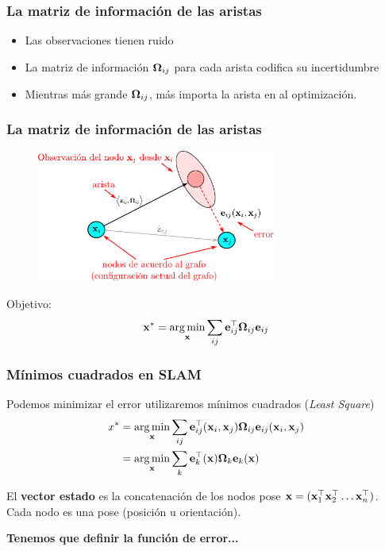 \begin{frame}
    \frametitle{La matriz de información de las aristas}
    \begin{itemize}
        \item Las observaciones tienen ruido
        \item La matriz de información $\boldsymbol{\mathbf{\Omega}}_{ij}$ para cada arista codifica su incertidumbre
        \item Mientras más grande $\boldsymbol{\mathbf{\Omega}}_{ij}$, más importa la arista en al optimización.
    \end{itemize}
    
\end{frame}

\begin{frame}
    \frametitle{La matriz de información de las aristas}
    \begin{figure}[!h]
        \includegraphics[width=0.7\textwidth]{images/factor_graph_edge_example.pdf}
    \end{figure}

    Objetivo:
    \begin{equation*}
        \boldsymbol{\mathbf{x}}^{*} = \operatorname*{arg\,min}_{\boldsymbol{\mathbf{x}}} \sum_{ij} \boldsymbol{\mathbf{e}}^{\top}_{ij} \boldsymbol{\mathbf{\Omega}}_{ij} \boldsymbol{\mathbf{e}}_{ij}
    \end{equation*}
    
\end{frame}



\begin{frame}
    \frametitle{Mínimos cuadrados en SLAM}
    Podemos minimizar el error utilizaremos mínimos cuadrados (\emph{Least Square})
    \begin{align*}
        x^{*} &= \operatorname*{arg\,min}_{\boldsymbol{\mathbf{x}}} \sum_{ij} \boldsymbol{\mathbf{e}}^{\top}_{ij}(\boldsymbol{\mathbf{x}}_{i},\boldsymbol{\mathbf{x}}_{j}) \boldsymbol{\mathbf{\Omega}}_{ij} \boldsymbol{\mathbf{e}}_{ij}(\boldsymbol{\mathbf{x}}_{i},\boldsymbol{\mathbf{x}}_{j})\\
                 &= \operatorname*{arg\,min}_{\boldsymbol{\mathbf{x}}} \sum_{k} \boldsymbol{\mathbf{e}}^{\top}_{k}(\boldsymbol{\mathbf{x}}) \boldsymbol{\mathbf{\Omega}}_{k} \boldsymbol{\mathbf{e}}_{k}(\boldsymbol{\mathbf{x}})
    \end{align*}
    
    El {\bf vector estado} es la concatenación de los nodos pose $\stateBold = (\stateBold_{1}^{\top} \stateBold_{2}^{\top} \dots \stateBold_{n}^{\top})$. Cada nodo es una pose (posición u orientación).
    
    \vspace{2em}
    {\bf Tenemos que definir la función de error...}
\end{frame}


